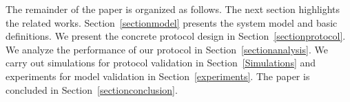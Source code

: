 
The remainder of the paper is organized as follows. 
The next section highlights the related works.
Section~\ref{sectionmodel} presents the system model and basic definitions.
We present the concrete protocol design
in Section~\ref{sectionprotocol}. 
We analyze the performance of our protocol in Section~\ref{sectionanalysis}. 
We carry out simulations for protocol validation in Section~\ref{Simulations}
and experiments for model validation in Section~\ref{experiments}.
The paper is concluded in Section~\ref{sectionconclusion}.
